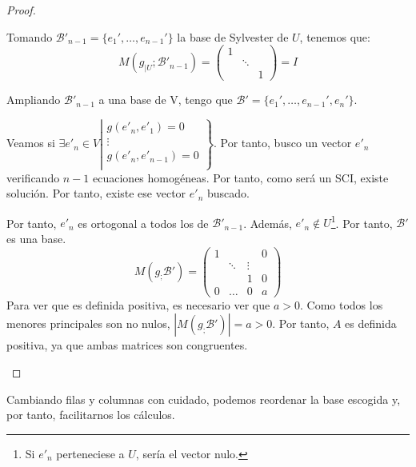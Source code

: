 \begin{teo}
\begin{proof}
\begin{description}
\begin{itemize}
            Tomando $\mathcal{B}'_{n-1}=\{e_1', \dots, e_{n-1}'\}$ la base de Sylvester de $U$, tenemos que:
            $$M(g_{\left|U\right.};\mathcal{B}'_{n-1}) = \left(\begin{array}{ccc}
                1 && \\
                 & \ddots & \\
                 & & 1
            \end{array}\right) = I$$

            Ampliando $\mathcal{B}'_{n-1}$ a una base de V, tengo que $\mathcal{B}'=\{e_1', \dots, e_{n-1}', e_n'\}$.

            Veamos si $\exists e'_n\in V\left|\begin{array}{l}
                g(e'_n,e'_1)=0 \\
                \vdots \\
                g(e'_n,e'_{n-1})=0 \\
            \end{array}\right\}$. Por tanto, busco un vector $e'_n$ verificando $n-1$ ecuaciones homogéneas. Por tanto, como será un SCI, existe solución. Por tanto, existe ese vector $e'_n$ buscado.

            Por tanto, $e'_n$ es ortogonal a todos los de $\mathcal{B}'_{n-1}$. Además, $e'_n\notin U$\footnote{Si $e'_n$ perteneciese a $U$, sería el vector nulo.}. Por tanto, $\mathcal{B}'$ es una base.
            $$M(g_;\mathcal{B}') = \left(\begin{array}{ccc|c}
                1 &&&0 \\
                 & \ddots & \vdots \\
                 & & 1 & 0 \\ \hline
                 0 & \dots & 0 & a
            \end{array}\right)$$
            Para ver que es definida positiva, es necesario ver que $a>0$. Como todos los menores principales son no nulos, $|M(g_;\mathcal{B}')| = a > 0$. Por tanto, $A$ es definida positiva, ya que ambas matrices son congruentes.
        \end{itemize}
    \end{description}
    \end{proof}
\end{teo}
\begin{observacion}
    Cambiando filas y columnas con cuidado, podemos reordenar la base escogida y, por tanto, facilitarnos los cálculos.
\end{observacion}

